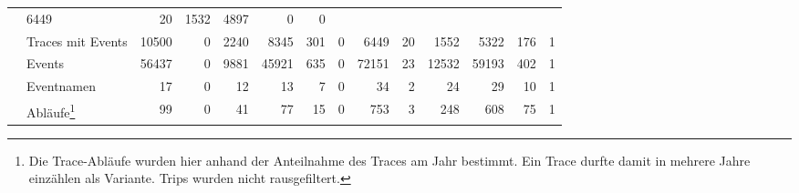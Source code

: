 \begin{table}[!htbp]
\begin{minipage}[c]{0.80\textwidth}
\begin{adjustbox}{max width=\textwidth}
\begin{tabular}{|c|l|r|*{5}{r}|r|*{5}{r}|}
                             & 6449 & 20 & 1532 & 4897 & 0 & 0 \\
                & Traces mit Events & 10500 & 0 & 2240 & 8345 & 301 & 0
                                    & 6449 & 20 & 1552 & 5322 & 176 & 1 \\
                & Events & 56437 & 0 & 9881 & 45921 & 635 & 0
                                  & 72151 & 23 & 12532 & 59193 & 402 & 1 \\
                & Eventnamen & 17 & 0 & 12 & 13 & 7 & 0
                             & 34 & 2 & 24 & 29 & 10 & 1 \\
                & Abläufe\footnote{Die Trace-Abläufe wurden hier anhand der Anteilnahme des Traces am Jahr bestimmt. Ein Trace durfte damit in mehrere Jahre einzählen als Variante. Trips wurden nicht rausgefiltert.} & 99 & 0 & 41 & 77 & 15 & 0
                             & 753 & 3 & 248 & 608 & 75 & 1 \\
            \hline
        \end{tabular}%
    \end{adjustbox}
    \end{minipage}\hfill%
    \begin{minipage}[c]{0.18\textwidth}
        \label{tab:basisstatistik}
    \end{minipage}
\end{table}


